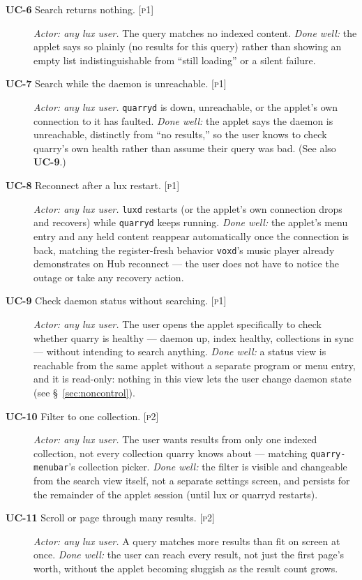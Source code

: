 \documentclass[a4paper,11pt]{report}
\newcommand{\uc}[1]{\textbf{UC-#1}}
\newcommand{\pone}{\textsc{[p1]}}
\newcommand{\ptwo}{\textsc{[p2]}}
\begin{document}
\begin{description}
\item[\uc{6} Search returns nothing. \pone{}] \emph{Actor: any lux user.}
  The query matches no indexed content. \emph{Done well:} the applet says
  so plainly (no results for this query) rather than showing an empty list
  indistinguishable from ``still loading'' or a silent failure.

\item[\uc{7} Search while the daemon is unreachable. \pone{}] \emph{Actor:
  any lux user.} \texttt{quarryd} is down, unreachable, or the applet's
  own connection to it has faulted. \emph{Done well:} the applet says the
  daemon is unreachable, distinctly from ``no results,'' so the user knows
  to check quarry's own health rather than assume their query was bad.
  (See also \uc{9}.)

\item[\uc{8} Reconnect after a lux restart. \pone{}] \emph{Actor: any lux
  user.} \texttt{luxd} restarts (or the applet's own connection drops and
  recovers) while \texttt{quarryd} keeps running. \emph{Done well:} the
  applet's menu entry and any held content reappear automatically once the
  connection is back, matching the register-fresh behavior
  \texttt{voxd}'s music player already demonstrates on Hub reconnect ---
  the user does not have to notice the outage or take any recovery action.

\item[\uc{9} Check daemon status without searching. \pone{}] \emph{Actor:
  any lux user.} The user opens the applet specifically to check whether
  quarry is healthy --- daemon up, index healthy, collections in sync ---
  without intending to search anything. \emph{Done well:} a status view is
  reachable from the same applet without a separate program or menu
  entry, and it is read-only: nothing in this view lets the user change
  daemon state (see \S~\ref{sec:noncontrol}).

\item[\uc{10} Filter to one collection. \ptwo{}] \emph{Actor: any lux
  user.} The user wants results from only one indexed collection, not
  every collection quarry knows about --- matching
  \texttt{quarry-menubar}'s collection picker. \emph{Done well:} the
  filter is visible and changeable from the search view itself, not a
  separate settings screen, and persists for the remainder of the applet
  session (until lux or quarryd restarts).

\item[\uc{11} Scroll or page through many results. \ptwo{}] \emph{Actor:
  any lux user.} A query matches more results than fit on screen at once.
  \emph{Done well:} the user can reach every result, not just the first
  page's worth, without the applet becoming sluggish as the result count
  grows.

\end{description}
\end{document}
